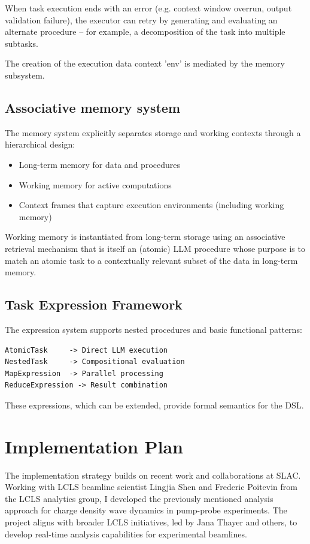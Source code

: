 \documentclass{article}
\begin{document}
When task execution ends with an error (e.g. context window overrun, output validation failure), the executor can retry by generating and evaluating an alternate procedure -- for example, a decomposition of the task into multiple subtasks.

The creation of the execution data context 'env' is mediated by the memory subsystem.

\subsection{Associative memory system}
The memory system explicitly separates storage and working contexts through a hierarchical design:
\begin{itemize}
    \item Long-term memory for data and procedures
    \item Working memory for active computations
    \item Context frames that capture execution environments (including working memory)
\end{itemize}

Working memory is instantiated from long-term storage using an associative retrieval mechanism that is itself an (atomic) LLM procedure whose purpose is to match an atomic task to a contextually relevant subset of the data in long-term memory.

\subsection{Task Expression Framework}
The expression system supports nested procedures and basic functional patterns:

\begin{lstlisting}[caption=Task Expression Types]
AtomicTask     -> Direct LLM execution
NestedTask     -> Compositional evaluation  
MapExpression  -> Parallel processing
ReduceExpression -> Result combination
\end{lstlisting}

These expressions, which can be extended, provide formal semantics for the DSL.

\section{Implementation Plan}
The implementation strategy builds on recent work and collaborations at SLAC. Working with LCLS beamline scientist Lingjia Shen and Frederic Poitevin from the LCLS analytics group, I developed the previously mentioned analysis approach for charge density wave dynamics in pump-probe experiments. The project aligns with broader LCLS initiatives, led by Jana Thayer and others, to develop real-time analysis capabilities for experimental beamlines.
\end{document}
